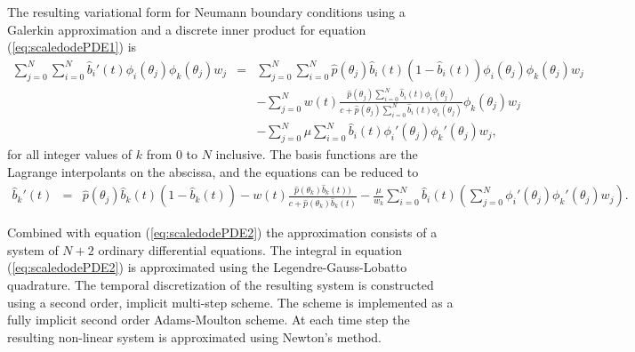 \documentclass[12pt]{article}
\begin{document}
The resulting variational form for Neumann boundary conditions using a
Galerkin approximation and a discrete inner product for equation
(\ref{eq:scaledodePDE1}) is
\begin{eqnarray}
  \sum_{j=0}^N \sum_{i=0}^N  \hat{b}_i'(t) \phi_i(\theta_j) \phi_k(\theta_j) w_j
  & = &
  \sum_{j=0}^N \sum_{i=0}^N \hat{p}(\theta_j)  \hat{b}_i(t) (1 - \hat{b}_i(t) ) \phi_i(\theta_j) \phi_k(\theta_j) w_j \\
  & &  -  \sum_{j=0}^N w(t) \frac{\hat{p}(\theta_j) \sum_{i=0}^N \hat{b}_i(t) \phi_i(\theta_j) }{c+\hat{p}(\theta_j) \sum_{i=0}^N \hat{b}_i(t) \phi_i(\theta_j)} \phi_k(\theta_j) w_j \nonumber \\ 
  & & - \sum_{j=0}^N \mu  \sum_{i=0}^N \hat{b}_i(t) \phi_i'(\theta_j) \phi_k'(\theta_j)  w_j, \nonumber
\end{eqnarray}
for all integer values of $k$ from $0$ to $N$ inclusive.  The basis
functions are the Lagrange interpolants on the abscissa, and the
equations can be reduced to
\begin{eqnarray}
  \hat{b}_k'(t) 
  & = &
        \hat{p}(\theta_j) \hat{b}_k(t) (1 - \hat{b}_k(t) )
        -  w(t) \frac{\hat{p}(\theta_k) \hat{b}_k(t)) }{c+\hat{p}(\theta_k)  \hat{b}_k(t) }  
   - \frac{\mu}{w_k} \sum_{i=0}^N \hat{b}_i(t) \left( \sum_{j=0}^N  \phi_i'(\theta_j) \phi_k'(\theta_j)  w_j \right).
\end{eqnarray}

Combined with equation (\ref{eq:scaledodePDE2}) the approximation
consists of a system of $N+2$ ordinary differential equations. The
integral in equation (\ref{eq:scaledodePDE2}) is approximated using
the Legendre-Gauss-Lobatto quadrature. The temporal discretization of
the resulting system is constructed using a second order, implicit
multi-step scheme. The scheme is implemented as a fully implicit
second order Adams-Moulton scheme\cite{ascher2011first}. At each time
step the resulting non-linear system is approximated using Newton's
method.


\clearpage


\end{document}
